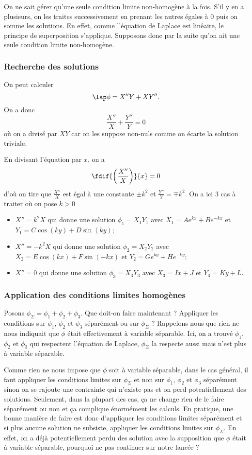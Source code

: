 On ne sait gérer qu'une seule condition limite non-homogène à la fois.
S'il y en a plusieurs, on les traites successivement en prenant les autres
égales à 0 puis on somme les solutions.
En effet, comme l'équation de Laplace est linéaire, le principe
de superposition s'applique.
Supposons donc par la suite qu'on ait une seule condition limite non-homogène.

\subsubsection{Recherche des solutions}
On peut calculer
\[ \lap \phi = X'' Y + X Y''. \]
On a donc
\[ \frac{X''}{X} + \frac{Y''}{Y} = 0 \]
où on a divisé par $XY$ car on les suppose non-nuls comme on
écarte la solution triviale.

En divisant l'équation par $x$, on a
\[ \fdif{\left(\frac{X''}{X}\right)}{x} = 0 \]
d'où on tire que $\frac{X''}{X}$ est égal à une constante $\pm k^2$
et $\frac{Y''}{Y} = \mp k^2$.
On a ici 3 cas à traiter où on pose $k > 0$
\begin{itemize}
  \item $X'' = k^2X$ qui donne une solution $\phi_1 = X_1Y_1$
    avec $X_1 = Ae^{kx} + Be^{-kx}$ et $Y_1 = C\cos(ky) + D\sin(ky)$;
  \item $X'' = -k^2X$ qui donne une solution $\phi_2 = X_2Y_2$
    avec $X_2 = E\cos(kx) + F\sin(-kx)$ et $Y_2 = Ge^{ky} + He^{-ky}$;
  \item $X'' = 0$ qui donne une solution $\phi_3 = X_3Y_3$
    avec $X_3 = Ix + J$ et $Y_3 = Ky + L$.
\end{itemize}

\subsubsection{Application des conditions limites homogènes}
Posons $\phi_\Sigma = \phi_1 + \phi_2 + \phi_3$.
Que doit-on faire maintenant ?
Appliquer les conditions sur $\phi_1$, $\phi_2$ et $\phi_3$ séparément ou
sur $\phi_\Sigma$ ?
Rappelons nous que rien ne nous indiquait que $\phi$ était effectivement
à variable séparable.
Ici, on a trouvé $\phi_1$, $\phi_2$ et $\phi_3$ qui respectent
l'équation de Laplace, $\phi_\Sigma$ la respecte aussi mais n'est plus
à variable séparable.

Comme rien ne nous impose que $\phi$ soit à variable séparable,
dans le cas général, il faut appliquer les conditions limites sur
$\phi_\Sigma$ et non sur $\phi_1$, $\phi_2$ et $\phi_3$ séparément sinon
on se rajoute une contrainte qui n'existe pas et on perd potentiellement
des solutions.
Seulement, dans la plupart des cas, ça ne change rien
de le faire séparément ou non et ça complique énormément les calculs.
En pratique, une bonne manière de faire est donc d'appliquer
les conditions limites séparément et si plus aucune solution
ne subsiste, appliquer les conditions limites sur $\phi_\Sigma$.
En effet, on a déjà potentiellement perdu des solution avec la supposition
que $\phi$ était à variable séparable, pourquoi ne pas continuer
sur notre lancée ?

